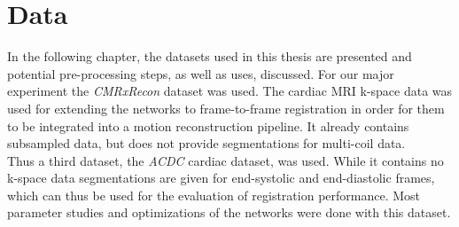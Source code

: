 \documentclass[english,version-2022-01]{uzl-thesis} %
\begin{document}


\chapter{Data}	\label{Ch:Data}
In the following chapter, the datasets used in this thesis are presented and potential pre-processing steps, as well as uses, discussed. 
For our major experiment the \emph{CMRxRecon} dataset was used. The cardiac MRI k-space data was used for extending the networks to frame-to-frame registration in order for them to be integrated into a motion reconstruction pipeline. It already contains subsampled data, but does not provide segmentations for multi-coil data.\\
Thus a third dataset, the \emph{ACDC} cardiac dataset, was used. While it contains no k-space data segmentations are given for end-systolic and end-diastolic frames, which can thus be used for the evaluation of registration performance. Most parameter studies and optimizations of the networks were done with this dataset.
\end{document}
